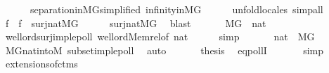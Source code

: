 \begin{isabellebody}
\ \ \ \ \ \ separation{\isacharunderscore}{\kern0pt}in{\isacharunderscore}{\kern0pt}MG{\isacharbrackleft}{\kern0pt}simplified{\isacharbrackright}{\kern0pt}\ infinity{\isacharunderscore}{\kern0pt}in{\isacharunderscore}{\kern0pt}MG\isanewline
\ \ \ \ \isamarkupfalse%
\ unfold{\isacharunderscore}{\kern0pt}locales\ simp{\isacharunderscore}{\kern0pt}all\isanewline
\ \ \isamarkupfalse%
\ f\ \ {\isachardoublequoteopen}f\ {\isasymin}\ surj{\isacharparenleft}{\kern0pt}nat{\isacharcomma}{\kern0pt}M{\isacharbrackleft}{\kern0pt}G{\isacharbrackright}{\kern0pt}{\isacharparenright}{\kern0pt}{\isachardoublequoteclose}\isanewline
\ \ \ \ \isamarkupfalse%
\ surj{\isacharunderscore}{\kern0pt}nat{\isacharunderscore}{\kern0pt}MG\ \isamarkupfalse%
\ blast\isanewline
\ \ \isamarkupfalse%
\isanewline
\ \ \isamarkupfalse%
\ {\isachardoublequoteopen}M{\isacharbrackleft}{\kern0pt}G{\isacharbrackright}{\kern0pt}\ {\isasymlesssim}\ nat{\isachardoublequoteclose}\ \isanewline
\ \ \ \ \isamarkupfalse%
\ well{\isacharunderscore}{\kern0pt}ord{\isacharunderscore}{\kern0pt}surj{\isacharunderscore}{\kern0pt}imp{\isacharunderscore}{\kern0pt}lepoll\ well{\isacharunderscore}{\kern0pt}ord{\isacharunderscore}{\kern0pt}Memrel{\isacharbrackleft}{\kern0pt}of\ nat{\isacharbrackright}{\kern0pt}\isanewline
\ \ \ \ \isamarkupfalse%
\ simp\isanewline
\ \ \isamarkupfalse%
\isanewline
\ \ \isamarkupfalse%
\ {\isachardoublequoteopen}nat\ {\isasymlesssim}\ M{\isacharbrackleft}{\kern0pt}G{\isacharbrackright}{\kern0pt}{\isachardoublequoteclose}\isanewline
\ \ \ \ \isamarkupfalse%
\ MG{\isachardot}{\kern0pt}nat{\isacharunderscore}{\kern0pt}into{\isacharunderscore}{\kern0pt}M\ subset{\isacharunderscore}{\kern0pt}imp{\isacharunderscore}{\kern0pt}lepoll\ \isamarkupfalse%
\ auto\isanewline
\ \ \isamarkupfalse%
\isanewline
\ \ \isamarkupfalse%
\ {\isacharquery}{\kern0pt}thesis\ \isamarkupfalse%
\ eqpollI\ \isanewline
\ \ \ \ \isamarkupfalse%
\ simp\isanewline
{}\isamarkupfalse%
%
\endisatagproof
{\isafoldproof}%
%
\isadelimproof
%
\endisadelimproof
%
\isadelimdocument
%
\endisadelimdocument
%
\isatagdocument
%
\isamarkuptrue%
%
\endisatagdocument
{\isafolddocument}%
%
\isadelimdocument
%
\endisadelimdocument
{}\isamarkupfalse%
\ extensions{\isacharunderscore}{\kern0pt}of{\isacharunderscore}{\kern0pt}ctms{\isacharcolon}{\kern0pt}\isanewline

\end{isabellebody}
